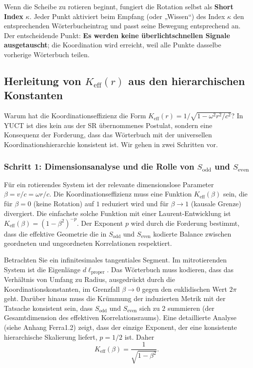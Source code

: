 \documentclass[12pt,a4paper]{article}
\newcommand{\Sodd}{S_{\mathrm{odd}}}
\newcommand{\Seven}{S_{\mathrm{even}}}
\begin{document}
	Wenn die Scheibe zu rotieren beginnt, fungiert die Rotation selbst als \textbf{Short Index} \(\kappa\). Jeder Punkt aktiviert beim Empfang (oder „Wissen“) des Index \(\kappa\) den entsprechenden Wörterbucheintrag und passt seine Bewegung entsprechend an. Der entscheidende Punkt: \textbf{Es werden keine überlichtschnellen Signale ausgetauscht}; die Koordination wird erreicht, weil alle Punkte dasselbe vorherige Wörterbuch teilen.
	
	\subsection{Herleitung von \(K_{\mathrm{eff}}(r)\) aus den hierarchischen Konstanten}
	\label{subsec:keff-derivation}
	
	Warum hat die Koordinationseffizienz die Form \(K_{\mathrm{eff}}(r) = 1/\sqrt{1-\omega^2 r^2/c^2}\)? In YUCT ist dies kein aus der SR übernommenes Postulat, sondern eine Konsequenz der Forderung, dass das Wörterbuch mit der universellen Koordinationshierarchie konsistent ist. Wir gehen in zwei Schritten vor.
	
	\subsubsection{Schritt 1: Dimensionsanalyse und die Rolle von \(\Sodd\) und \(\Seven\)}
	Für ein rotierendes System ist der relevante dimensionslose Parameter \(\beta = v/c = \omega r/c\). Die Koordinationseffizienz muss eine Funktion \(K_{\mathrm{eff}}(\beta)\) sein, die für \(\beta = 0\) (keine Rotation) auf \(1\) reduziert wird und für \(\beta \to 1\) (kausale Grenze) divergiert. Die einfachste solche Funktion mit einer Laurent-Entwicklung ist \(K_{\mathrm{eff}}(\beta) = (1-\beta^2)^{-p}\). Der Exponent \(p\) wird durch die Forderung bestimmt, dass die effektive Geometrie die in \(\Sodd\) und \(\Seven\) kodierte Balance zwischen geordneten und ungeordneten Korrelationen respektiert.
	
	Betrachten Sie ein infinitesimales tangentiales Segment. Im mitrotierenden System ist die Eigenlänge \(d\ell_{\text{proper}}\). Das Wörterbuch muss kodieren, dass das Verhältnis von Umfang zu Radius, ausgedrückt durch die Koordinationskonstanten, im Grenzfall \(\beta \to 0\) gegen den euklidischen Wert \(2\pi\) geht. Darüber hinaus muss die Krümmung der induzierten Metrik mit der Tatsache konsistent sein, dass \(\Sodd\) und \(\Seven\) sich zu \(2\) summieren (der Gesamtdimension des effektiven Korrelationsraums). Eine detaillierte Analyse (siehe Anhang Ferra1.2) zeigt, dass der einzige Exponent, der eine konsistente hierarchische Skalierung liefert, \(p = 1/2\) ist. Daher
	\[
	K_{\mathrm{eff}}(\beta) = \frac{1}{\sqrt{1-\beta^2}}.
	\]
	
\end{document}
